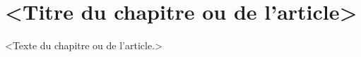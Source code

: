 \chapter{<Titre du chapitre ou de l'article>}     %
\label{chap:}                   %

<Texte du chapitre ou de l'article.>
